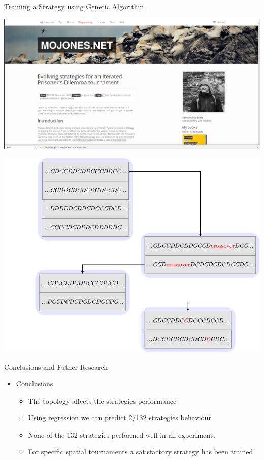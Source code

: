 \documentclass{beamer}
\begin{document}
\begin{frame}{Training a Strategy using Genetic Algorithm}
	\begin{center}
		\includegraphics[width=1\linewidth]{static/martin_jone_work.png}
	\end{center}
\end{frame}

\begin{frame}
	\begin{center}
		\includegraphics[width=1\linewidth]{static/genetic_algorithm_example.pdf}
	\end{center}
\end{frame}

\begin{frame}{Conclusions and Futher Research}
    \begin{itemize}
    \item Conclusions
    \begin{itemize}[label={--}]
        \item The topology affects the strategies performance
        \item Using regression we can predict 2/132 strategies behaviour
        \item None of the 132 strategies performed well in all experiments
        \item For specific spatial tournaments a satisfactory strategy has been trained
    \end{itemize}
    \end{itemize}
\end{frame}
\end{document}

